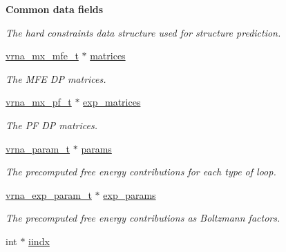\begin{Indent}{\bf Common data fields}
\begin{DoxyCompactItemize}
\begin{DoxyCompactList}\small\item\em The hard constraints data structure used for structure prediction. \end{DoxyCompactList}\item 
\hyperlink{group__dp__matrices_gae5aef35d016475e758f619b7bcb534f9}{vrna\+\_\+mx\+\_\+mfe\+\_\+t} $\ast$ \hyperlink{group__fold__compound_aca8be7bdc65bafe2172c6ee777f18568}{matrices}\hypertarget{group__fold__compound_aca8be7bdc65bafe2172c6ee777f18568}{}\label{group__fold__compound_aca8be7bdc65bafe2172c6ee777f18568}

\begin{DoxyCompactList}\small\item\em The M\+FE DP matrices. \end{DoxyCompactList}\item 
\hyperlink{group__dp__matrices_ga68729ab3fed26bdd1806fa814f172fc1}{vrna\+\_\+mx\+\_\+pf\+\_\+t} $\ast$ \hyperlink{group__fold__compound_afc38ed5a1028a2712d2365274bf49727}{exp\+\_\+matrices}\hypertarget{group__fold__compound_afc38ed5a1028a2712d2365274bf49727}{}\label{group__fold__compound_afc38ed5a1028a2712d2365274bf49727}

\begin{DoxyCompactList}\small\item\em The PF DP matrices. \end{DoxyCompactList}\item 
\hyperlink{group__energy__parameters_ga8a69ca7d787e4fd6079914f5343a1f35}{vrna\+\_\+param\+\_\+t} $\ast$ \hyperlink{group__fold__compound_a19b8720c2c5321c1b97c830bd17566ea}{params}\hypertarget{group__fold__compound_a19b8720c2c5321c1b97c830bd17566ea}{}\label{group__fold__compound_a19b8720c2c5321c1b97c830bd17566ea}

\begin{DoxyCompactList}\small\item\em The precomputed free energy contributions for each type of loop. \end{DoxyCompactList}\item 
\hyperlink{group__energy__parameters_ga01d8b92fe734df8d79a6169482c7d8d8}{vrna\+\_\+exp\+\_\+param\+\_\+t} $\ast$ \hyperlink{group__fold__compound_a7052a5d24f6091b9c5f79edcc9456a12}{exp\+\_\+params}\hypertarget{group__fold__compound_a7052a5d24f6091b9c5f79edcc9456a12}{}\label{group__fold__compound_a7052a5d24f6091b9c5f79edcc9456a12}

\begin{DoxyCompactList}\small\item\em The precomputed free energy contributions as Boltzmann factors. \end{DoxyCompactList}\item 
int $\ast$ \hyperlink{group__fold__compound_afdead4cf55c882d3497e779573e17e03}{iindx}\hypertarget{group__fold__compound_afdead4cf55c882d3497e779573e17e03}{}\label{group__fold__compound_afdead4cf55c882d3497e779573e17e03}


\end{DoxyCompactItemize}
\end{Indent}
